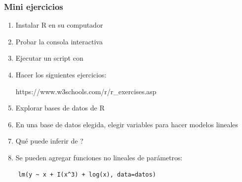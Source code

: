 \documentclass[14pt,aspectratio=169,xcolor=dvipsnames]{beamer}
\begin{document}
\begin{frame}
    \maketitle
\end{frame}
\begin{frame}\frametitle{Mini ejercicios}
    \begin{enumerate}
        \item Instalar R en su computador 
        \item Probar la consola interactiva
        \item Ejecutar un script con 
        \item Hacer los siguientes ejercicios: 
            \begin{center}
                https://www.w3schools.com/r/r\_exercises.asp
            \end{center}
        \item Explorar bases de datos de R
        \item En una base de datos elegida, elegir variables para hacer modelos lineales
        \item Qué puede inferir de ?
        \item Se pueden agregar funciones no lineales de parámetros:
    \end{enumerate}

            \begin{verbatim}
    lm(y ~ x + I(x^3) + log(x), data=datos)
            \end{verbatim}
\end{frame}
\end{document}
